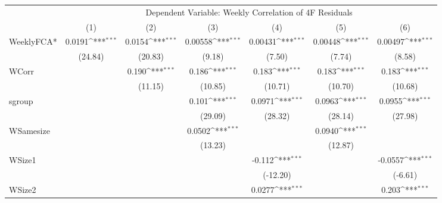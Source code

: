 {
\def\sym#1{\ifmmode^{#1}\else\(^{#1}\)\fi}
\begin{tabular}{l*{6}{c}}
\hline\hline
 & \multicolumn{6}{c}{Dependent Variable: Weekly Correlation of 4F Residuals}                 \\
 \cline{2-7}
                    &\multicolumn{1}{c}{(1)}         &\multicolumn{1}{c}{(2)}         &\multicolumn{1}{c}{(3)}         &\multicolumn{1}{c}{(4)}         &\multicolumn{1}{c}{(5)}         &\multicolumn{1}{c}{(6)}         \\
\hline
WeeklyFCA*          &      0.0191\sym{***}&      0.0154\sym{***}&     0.00558\sym{***}&     0.00431\sym{***}&     0.00448\sym{***}&     0.00497\sym{***}\\
                    &     (24.84)         &     (20.83)         &      (9.18)         &      (7.50)         &      (7.74)         &      (8.58)         \\
[1em]
WCorr               &                     &       0.190\sym{***}&       0.186\sym{***}&       0.183\sym{***}&       0.183\sym{***}&       0.183\sym{***}\\
                    &                     &     (11.15)         &     (10.85)         &     (10.71)         &     (10.70)         &     (10.68)         \\
[1em]
sgroup              &                     &                     &       0.101\sym{***}&      0.0971\sym{***}&      0.0963\sym{***}&      0.0955\sym{***}\\
                    &                     &                     &     (29.09)         &     (28.32)         &     (28.14)         &     (27.98)         \\
[1em]
WSamesize           &                     &                     &      0.0502\sym{***}&                     &      0.0940\sym{***}&                     \\
                    &                     &                     &     (13.23)         &                     &     (12.87)         &                     \\
[1em]
WSize1              &                     &                     &                     &      -0.112\sym{***}&                     &     -0.0557\sym{***}\\
                    &                     &                     &                     &    (-12.20)         &                     &     (-6.61)         \\
[1em]
WSize2              &                     &                     &                     &      0.0277\sym{***}&                     &       0.203\sym{***}\\

\end{tabular}}
